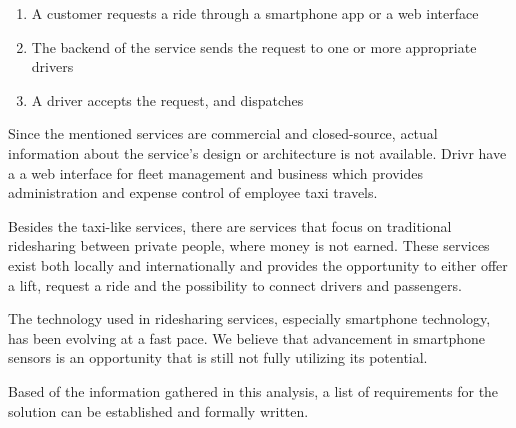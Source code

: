 \begin{enumerate}
	\item A customer requests a ride through a smartphone app or a web interface
	\item The backend of the service sends the request to one or more appropriate drivers
	\item A driver accepts the request, and dispatches
\end{enumerate}

Since the mentioned services are commercial and closed-source, actual information about the service's design or architecture is not available.
Drivr have a a web interface for fleet management and business which provides administration and expense control of employee taxi travels.

Besides the taxi-like services, there are services that focus on traditional ridesharing between private people, where money is not earned.
These services exist both locally and internationally and provides the opportunity to either offer a lift, request a ride and the possibility to connect drivers and passengers.



The technology used in ridesharing services, especially smartphone technology, has been evolving at a fast pace.\cite{fastCOMPUTERPHONES}
We believe that advancement in smartphone sensors is an opportunity that is still not fully utilizing its potential.

Based of the information gathered in this analysis, a list of requirements for the solution can be established and formally written.